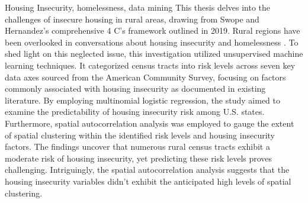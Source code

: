 
\begin{abstract}
This thesis explores rural housing insecurity through Swope and Hernandez’s (2019) 4 C's of housing insecurity in rural areas. Little attention has been paid to rural areas in the conversation on housing insecurity and houselessness \citet{gleason_using_2021}. To facilitate further discussion on this understudied issue, this exploratory study used unsupervised machine learning to group census tracts into risk levels across seven axes of data from the American Community Survey. The axes were based on housing insecurity factors found in the literature. \textit{K}-medoids clustering is used to group census tracts into high, medium, and low risk of housing insecurity for each axes. Multinomial logistic regression was used to determine variation between U.S. states based on how well state risk levels could be predicted with the national dataset. Furthermore, spatial autocorrelation analysis was employed to gauge the extent of spatial clustering within the identified risk levels and housing insecurity factors. The results indicate that many rural census tracts have a medium risk of housing insecurity, and the risk levels are hard to predict. The spatial autocorrelation results show that the housing insecurity variables were not as highly spatially clustered as expected.  
\end{abstract}

\begin{layabstract}{Housing Insecurity, homelessness, data mining}	%
This thesis delves into the challenges of insecure housing in rural areas, drawing from Swope and Hernandez's comprehensive 4 C's framework outlined in 2019. Rural regions have been overlooked in conversations about housing insecurity and homelessness \citet{gleason_using_2021}. To shed light on this neglected issue, this investigation utilized unsupervised machine learning techniques. It categorized census tracts into risk levels across seven key data axes sourced from the American Community Survey, focusing on factors commonly associated with housing insecurity as documented in existing literature. By employing multinomial logistic regression, the study aimed to examine the predictability of housing insecurity risk among U.S. states. Furthermore, spatial autocorrelation analysis was employed to gauge the extent of spatial clustering within the identified risk levels and housing insecurity factors. The findings uncover that numerous rural census tracts exhibit a moderate risk of housing insecurity, yet predicting these risk levels proves challenging. Intriguingly, the spatial autocorrelation analysis suggests that the housing insecurity variables didn't exhibit the anticipated high levels of spatial clustering.


\end{layabstract}

